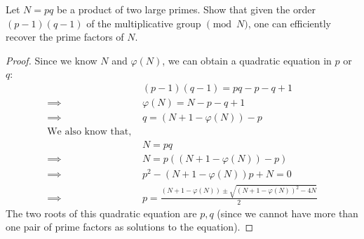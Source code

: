 \begin{solution}[label=ques:4]
  \begin{question}
    Let $N=pq$ be a product of two large primes.  Show that given the order $(p-1)(q-1)$ of the multiplicative group $\pmod{N}$, one can efficiently recover the prime factors of $N$.
  \end{question}
  \tcblower{}
  \begin{proof}
    Since we know $N$ and $\varphi(N)$, we can obtain a quadratic equation in $p$ or $q$:
    \begin{equation}
      \begin{split}
        &(p-1)(q-1) = pq - p - q + 1\\
        \implies &\varphi(N) = N - p - q + 1\\
        \implies &q = (N + 1 - \varphi(N)) - p\\
        \text{We also know that, }&\\
        &N = pq\\
        \implies &N = p((N + 1 - \varphi(N)) - p)\\
        \implies &p^2 - (N + 1 - \varphi(N))p + N = 0\\
        \implies &p = \frac{(N + 1 - \varphi(N)) \pm \sqrt{(N + 1 - \varphi(N))^2 - 4N}}{2}
      \end{split}
      \label{eq:nphipq}
    \end{equation}
    The two roots of this quadratic equation are $p, q$ (since we cannot have more than one pair of prime factors as solutions to the equation).
  \end{proof}
\end{solution}
